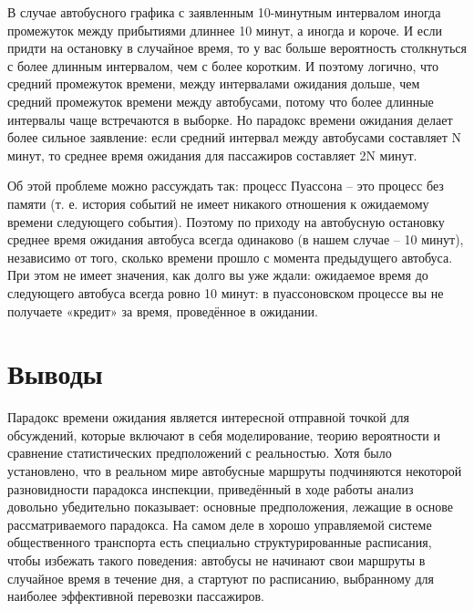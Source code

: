 \documentclass[a4paper,10pt,twoside]{article}
\begin{document}
\begin{multicols}{2}
{В случае автобусного графика с заявленным 10-минутным интервалом иногда промежуток между прибытиями длиннее 10 минут, а иногда и короче. И если придти на остановку в случайное время, то у вас больше вероятность столкнуться с более длинным интервалом, чем с более коротким. И поэтому логично, что средний промежуток времени, между интервалами ожидания дольше, чем средний промежуток времени между автобусами, потому что более длинные интервалы чаще встречаются в выборке. Но парадокс времени ожидания делает более сильное заявление: если средний интервал между автобусами составляет N минут, то среднее время ожидания для пассажиров составляет 2N минут.

Об этой проблеме можно рассуждать так: процесс Пуассона -- это процесс без памяти (т. е. история событий не имеет никакого отношения к ожидаемому времени следующего события). Поэтому по приходу на автобусную остановку среднее время ожидания автобуса всегда одинаково (в нашем случае -- 10 минут), независимо от того, сколько времени прошло с момента предыдущего автобуса. При этом не имеет значения, как долго вы уже ждали: ожидаемое время до следующего автобуса всегда ровно 10 минут: в пуассоновском процессе вы не получаете «кредит» за время, проведённое в ожидании.
}%

\section{Выводы}
Парадокс времени ожидания является интересной отправной точкой для обсуждений, которые включают в себя моделирование, теорию вероятности и сравнение статистических предположений с реальностью. Хотя было установлено, что в реальном мире автобусные маршруты подчиняются некоторой разновидности парадокса инспекции, приведённый в ходе работы анализ довольно убедительно показывает: основные предположения, лежащие в основе рассматриваемого парадокса. На самом деле в хорошо управляемой системе общественного транспорта есть специально структурированные расписания, чтобы избежать такого поведения: автобусы не начинают свои маршруты в случайное время в течение дня, а стартуют по расписанию, выбранному для наиболее эффективной перевозки пассажиров.

%

\end{multicols}
%
\end{document}
